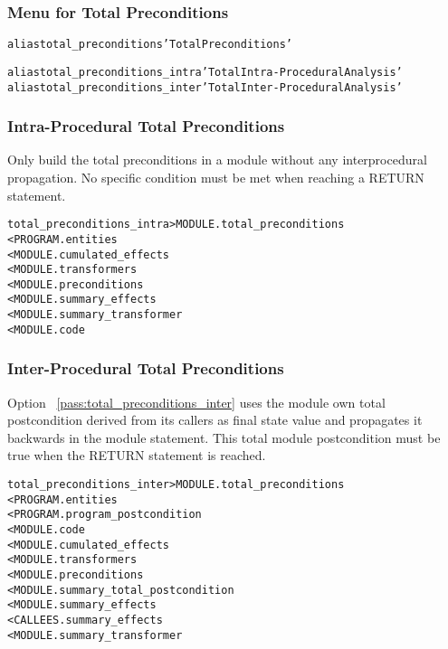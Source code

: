 \documentclass[a4paper]{report}
\newenvironment{PipsMake}{\begin{alltt}}{\end{alltt}}
\newcommand{\PipsPassRef}[1]{\texttt{\detokenize{#1}}~\ref{pass:#1}}
\newenvironment{PipsPass}[1]{\label{pass:#1}}{}
\begin{document}
\subsubsection{Menu for Total Preconditions}

\begin{PipsMake}
alias total_preconditions 'Total Preconditions'

alias total_preconditions_intra 'Total Intra-Procedural Analysis'
alias total_preconditions_inter 'Total Inter-Procedural Analysis'
\end{PipsMake}

\subsubsection{Intra-Procedural Total Preconditions}

\begin{PipsPass}{total_preconditions_intra}
Only build the total preconditions in a module without any interprocedural
propagation. No specific condition must be met when reaching a RETURN statement.
\end{PipsPass}

\begin{PipsMake}
total_preconditions_intra            > MODULE.total_preconditions
        < PROGRAM.entities
        < MODULE.cumulated_effects
        < MODULE.transformers
        < MODULE.preconditions
        < MODULE.summary_effects
        < MODULE.summary_transformer
        < MODULE.code
\end{PipsMake}

\subsubsection{Inter-Procedural Total Preconditions}

\begin{PipsPass}{total_preconditions_inter}
Option \PipsPassRef{total_preconditions_inter} uses the module own total postcondition
derived from its callers as final state value and propagates it
backwards in the module statement. This total module postcondition must be
true when the RETURN statement is reached.
\end{PipsPass}


\begin{PipsMake}

total_preconditions_inter        > MODULE.total_preconditions
        < PROGRAM.entities
        < PROGRAM.program_postcondition
        < MODULE.code
        < MODULE.cumulated_effects
        < MODULE.transformers
        < MODULE.preconditions
        < MODULE.summary_total_postcondition
        < MODULE.summary_effects
        < CALLEES.summary_effects
        < MODULE.summary_transformer
\end{PipsMake}
\end{document}
